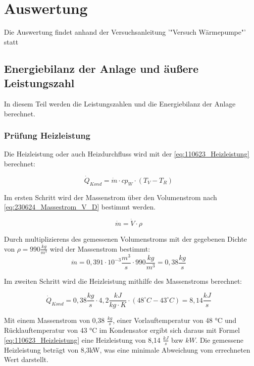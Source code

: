 \section{Auswertung}
\label{sec:Auswertung}
Die Auswertung findet anhand der Versuchsanleitung '"Versuch Wärmepumpe"' statt\cite[S.14]{Anleitung-WP}
\subsection{Energiebilanz der Anlage und äußere Leistungszahl}
In diesem Teil werden die Leistungszahlen und die Energiebilanz der Anlage berechnet.

\subsubsection{Prüfung Heizleistung}
\label{subsubsec:Heizleistung}

Die Heizleistung oder auch Heizdurchfluss wird mit der \autoref{eq:110623_Heizleistung} berechnet:

\begin{equation}
\dot Q_{Kond}= \dot m \cdot cp_{W} \cdot (T_{V} - T_{R})
\label{eq:110623_Heizleistung}
\end{equation}

Im ersten Schritt wird der Massenstrom über den Volumenstrom nach \autoref{eq:230624_Massestrom_V_D} bestimmt werden.

\begin{equation}
    \dot{m}= \dot{V}\cdot \rho
    \label{eq:230624_Massestrom_V_D}
\end{equation}

Durch multiplizierens des gemessenen Volumenstroms mit der gegebenen Dichte von $\rho = 990 \frac{kg}{m^3}$ wird der Massenstrom bestimmt:
$$\dot{m}= 0,391 \cdot 10^{-3}\frac{m^3}{s} \cdot 990 \frac{kg}{m^3}=0,38 \frac{kg}{s}$$

Im zweiten Schritt wird die Heizleistung mithilfe des Massenstroms berechnet:

$$\dot Q_{Kond}= 0,38 \frac{kg}{s} \cdot 4,2 \frac{kJ}{kg \cdot K} \cdot (48 ^{\circ}C - 43 ^{\circ}C) = 8,14 \frac{kJ}{s}$$

Mit einem Massenstrom von 0,38 $\frac{kg}{s}$, einer Vorlauftemperatur von 48 °C und Rücklauftemperatur von 43 °C im Kondensator ergibt sich daraus mit Formel \ref{eq:110623_Heizleistung} eine Heizleistung von 8,14 $\frac{kJ}{s}$ bzw $kW$.
 Die gemessene Heizleistung beträgt von 8,3kW, was eine minimale Abweichung vom errechneten Wert darstellt.
\newpage

